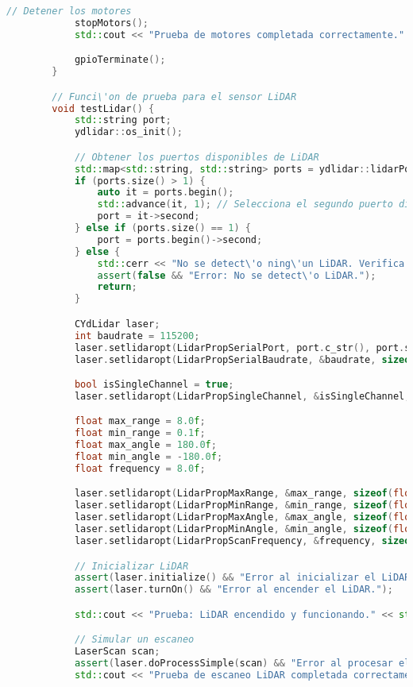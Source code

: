 \begin{lstlisting}[language={C++}, caption={C\'odigo de pruebas de integraci\'organismo}, label={Script}]
            // Detener los motores
            stopMotors();
            std::cout << "Prueba de motores completada correctamente." << std::endl;

            gpioTerminate();
        }

        // Funci\'on de prueba para el sensor LiDAR
        void testLidar() {
            std::string port;
            ydlidar::os_init();

            // Obtener los puertos disponibles de LiDAR
            std::map<std::string, std::string> ports = ydlidar::lidarPortList();
            if (ports.size() > 1) {
                auto it = ports.begin();
                std::advance(it, 1); // Selecciona el segundo puerto disponible
                port = it->second;
            } else if (ports.size() == 1) {
                port = ports.begin()->second;
            } else {
                std::cerr << "No se detect\'o ning\'un LiDAR. Verifica la conexi\'on." << std::endl;
                assert(false && "Error: No se detect\'o LiDAR.");
                return;
            }

            CYdLidar laser;
            int baudrate = 115200;
            laser.setlidaropt(LidarPropSerialPort, port.c_str(), port.size());
            laser.setlidaropt(LidarPropSerialBaudrate, &baudrate, sizeof(int));

            bool isSingleChannel = true;
            laser.setlidaropt(LidarPropSingleChannel, &isSingleChannel, sizeof(bool));

            float max_range = 8.0f;
            float min_range = 0.1f;
            float max_angle = 180.0f;
            float min_angle = -180.0f;
            float frequency = 8.0f;

            laser.setlidaropt(LidarPropMaxRange, &max_range, sizeof(float));
            laser.setlidaropt(LidarPropMinRange, &min_range, sizeof(float));
            laser.setlidaropt(LidarPropMaxAngle, &max_angle, sizeof(float));
            laser.setlidaropt(LidarPropMinAngle, &min_angle, sizeof(float));
            laser.setlidaropt(LidarPropScanFrequency, &frequency, sizeof(float));

            // Inicializar LiDAR
            assert(laser.initialize() && "Error al inicializar el LiDAR.");
            assert(laser.turnOn() && "Error al encender el LiDAR.");

            std::cout << "Prueba: LiDAR encendido y funcionando." << std::endl;

            // Simular un escaneo
            LaserScan scan;
            assert(laser.doProcessSimple(scan) && "Error al procesar el escaneo LiDAR.");
            std::cout << "Prueba de escaneo LiDAR completada correctamente." << std::endl;


\end{lstlisting}
